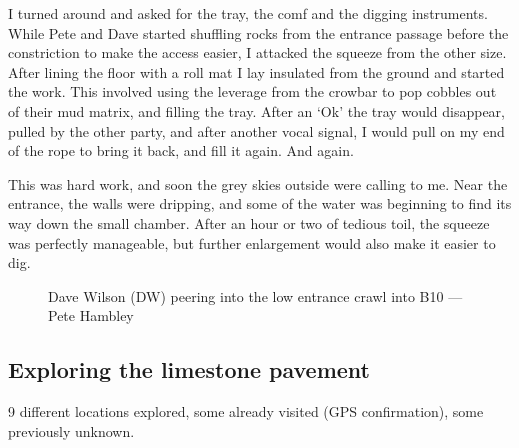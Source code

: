 I turned around and asked for the tray, the comf and the digging instruments. While Pete and Dave started shuffling rocks from the entrance passage before the constriction to make the access easier, I attacked the squeeze from the other size. After lining the floor with a roll mat I lay insulated from the ground and started the work. This involved using the leverage from the crowbar to pop cobbles out of their mud matrix, and filling the tray. After an `Ok' the tray would disappear, pulled by the other party, and after another vocal signal, I would pull on my end of the rope to bring it back, and fill it again. And again.

This was hard work, and soon the grey skies outside were calling to me. Near the entrance, the walls were dripping, and some of the water was beginning to find its way down the small chamber. After an hour or two of tedious toil, the squeeze was perfectly manageable, but further enlargement would also make it easier to dig.

\begin{figure*}[t!]
	\checkoddpage \ifoddpage \forcerectofloat \else \forceversofloat \fi
	\centering
	\label{dw jailbreak}
	\caption{Dave Wilson (DW) peering into the low entrance crawl into B10 --- Pete Hambley}
\end{figure*}


\subsection{Exploring the limestone pavement}
\label{sec:limestone pavement}
9 different locations explored, some already visited (GPS confirmation), some previously unknown.


